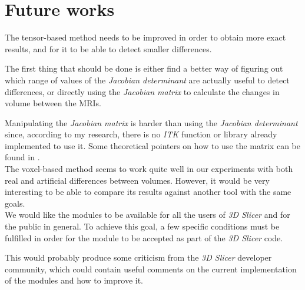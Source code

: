 \section{Future works}

The tensor-based method needs to be improved in order to obtain more
exact results, and for it to be able to detect smaller differences.

The first thing that should be done is either find a better way of
figuring out which range of values of the \textit{Jacobian
  determinant} are actually useful to detect differences, or directly
using the \textit{Jacobian matrix} to calculate the changes in volume
between the MRIs.

Manipulating the \textit{Jacobian matrix} is harder than using the
\textit{Jacobian determinant} since, according to my research, there
is no \textit{ITK} function or library already implemented to use
it. Some theoretical pointers on how to use the matrix can be found in
\cite{ashburner}.\\

The voxel-based method seems to work quite well in our experiments
with both real and artificial differences between volumes. However, it
would be very interesting to be able to compare its results against
another tool with the same goals.\\

We would like the modules to be available for all the users of
\textit{3D Slicer} and for the public in general. To achieve this
goal, a few specific conditions must be fulfilled in order for the
module to be accepted as part of the \textit{3D Slicer} code.

This would probably produce some criticism from the \textit{3D Slicer}
developer community, which could contain useful comments on the
current implementation of the modules and how to improve it.\\


